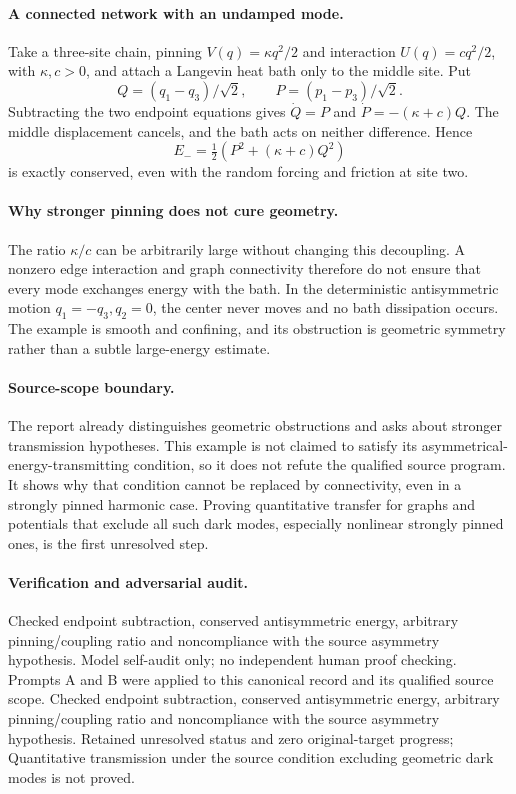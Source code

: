 \documentclass[11pt]{article}
\begin{document}
\paragraph{A connected network with an undamped mode.} Take a three-site chain, pinning $V(q)=\kappa q^2/2$ and interaction $U(q)=cq^2/2$, with $\kappa,c>0$, and attach a Langevin heat bath only to the middle site. Put
\[
 Q=(q_1-q_3)/\sqrt2,\qquad P=(p_1-p_3)/\sqrt2.
\]
Subtracting the two endpoint equations gives $\dot Q=P$ and $\dot P=-(\kappa+c)Q$. The middle displacement cancels, and the bath acts on neither difference. Hence
\[
 E_-=\tfrac12(P^2+(\kappa+c)Q^2)
\]
is exactly conserved, even with the random forcing and friction at site two.

\paragraph{Why stronger pinning does not cure geometry.} The ratio $\kappa/c$ can be arbitrarily large without changing this decoupling. A nonzero edge interaction and graph connectivity therefore do not ensure that every mode exchanges energy with the bath. In the deterministic antisymmetric motion $q_1=-q_3,q_2=0$, the center never moves and no bath dissipation occurs. The example is smooth and confining, and its obstruction is geometric symmetry rather than a subtle large-energy estimate.

\paragraph{Source-scope boundary.} The report already distinguishes geometric obstructions and asks about stronger transmission hypotheses. This example is not claimed to satisfy its asymmetrical-energy-transmitting condition, so it does not refute the qualified source program. It shows why that condition cannot be replaced by connectivity, even in a strongly pinned harmonic case. Proving quantitative transfer for graphs and potentials that exclude all such dark modes, especially nonlinear strongly pinned ones, is the first unresolved step.

\paragraph{Verification and adversarial audit.}
Checked endpoint subtraction, conserved antisymmetric energy, arbitrary pinning/coupling ratio and noncompliance with the source asymmetry hypothesis. Model self-audit only; no independent human proof checking. Prompts A and B were applied to this canonical record and its qualified source scope. Checked endpoint subtraction, conserved antisymmetric energy, arbitrary pinning/coupling ratio and noncompliance with the source asymmetry hypothesis. Retained unresolved status and zero original-target progress; Quantitative transmission under the source condition excluding geometric dark modes is not proved.
\end{document}
